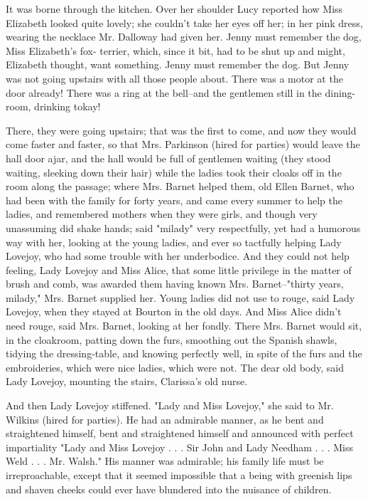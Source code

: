 \documentclass[lang=cn,10pt]{elegantbook}
\begin{document}
It was borne through the kitchen.  Over her shoulder Lucy reported
how Miss Elizabeth looked quite lovely; she couldn't take her eyes
off her; in her pink dress, wearing the necklace Mr. Dalloway had
given her.  Jenny must remember the dog, Miss Elizabeth's fox-
terrier, which, since it bit, had to be shut up and might,
Elizabeth thought, want something.  Jenny must remember the dog.
But Jenny was not going upstairs with all those people about.
There was a motor at the door already!  There was a ring at the
bell--and the gentlemen still in the dining-room, drinking tokay!

There, they were going upstairs; that was the first to come, and
now they would come faster and faster, so that Mrs. Parkinson
(hired for parties) would leave the hall door ajar, and the hall
would be full of gentlemen waiting (they stood waiting, sleeking
down their hair) while the ladies took their cloaks off in the room
along the passage; where Mrs. Barnet helped them, old Ellen Barnet,
who had been with the family for forty years, and came every summer
to help the ladies, and remembered mothers when they were girls,
and though very unassuming did shake hands; said "milady" very
respectfully, yet had a humorous way with her, looking at the young
ladies, and ever so tactfully helping Lady Lovejoy, who had some
trouble with her underbodice.  And they could not help feeling,
Lady Lovejoy and Miss Alice, that some little privilege in the
matter of brush and comb, was awarded them having known Mrs.
Barnet--"thirty years, milady," Mrs. Barnet supplied her.  Young
ladies did not use to rouge, said Lady Lovejoy, when they stayed at
Bourton in the old days.  And Miss Alice didn't need rouge, said
Mrs. Barnet, looking at her fondly.  There Mrs. Barnet would sit,
in the cloakroom, patting down the furs, smoothing out the Spanish
shawls, tidying the dressing-table, and knowing perfectly well, in
spite of the furs and the embroideries, which were nice ladies,
which were not.  The dear old body, said Lady Lovejoy, mounting the
stairs, Clarissa's old nurse.

And then Lady Lovejoy stiffened.  "Lady and Miss Lovejoy," she said
to Mr. Wilkins (hired for parties).  He had an admirable manner, as
he bent and straightened himself, bent and straightened himself and
announced with perfect impartiality "Lady and Miss Lovejoy . . .
Sir John and Lady Needham . . . Miss Weld . . . Mr. Walsh."  His
manner was admirable; his family life must be irreproachable,
except that it seemed impossible that a being with greenish lips
and shaven cheeks could ever have blundered into the nuisance of
children.
\end{document}
